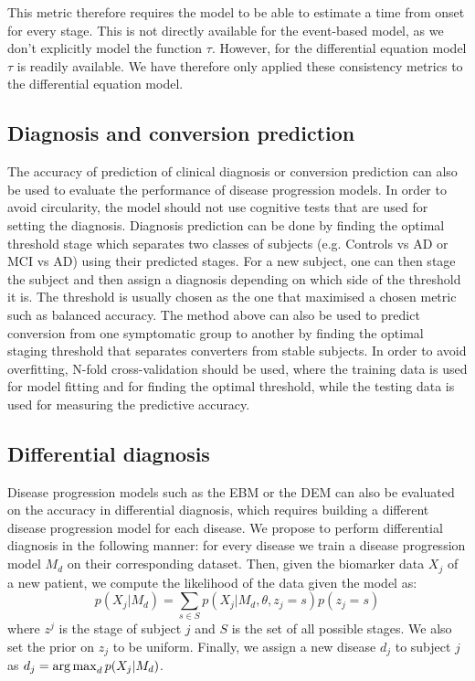 This metric therefore requires the model to be able to estimate a time from onset for every stage. This is not directly available for the event-based model, as we don't explicitly model the function $\tau$. However, for the differential equation model $\tau$ is readily available. We have therefore only applied these consistency metrics to the differential equation model.

\subsection{Diagnosis and conversion prediction}
\label{sec:diagBasedMetrics}

The accuracy of prediction of clinical diagnosis or conversion prediction can also be used to evaluate the performance of disease progression models. In order to avoid circularity, the model should not use cognitive tests that are used for setting the diagnosis. Diagnosis prediction can be done by finding the optimal threshold stage which separates two classes of subjects (e.g. Controls vs AD or MCI vs AD) using their predicted stages. For a new subject, one can then stage the subject and then assign a diagnosis depending on which side of the threshold it is. The threshold is usually chosen as the one that maximised a chosen metric such as balanced accuracy. The method above can also be used to predict conversion from one symptomatic group to another by finding the optimal staging threshold that separates converters from stable subjects. In order to avoid overfitting, N-fold cross-validation should be used, where the training data is used for model fitting and for finding the optimal threshold, while the testing data is used for measuring the predictive accuracy. 

\subsection{Differential diagnosis}
\label{sec:diff_diagnosis_ebm}
% 
Disease progression models such as the EBM or the DEM can also be evaluated on the accuracy in differential diagnosis, which requires building a different disease progression model for each disease. We propose to perform differential diagnosis in the following manner: for every disease we train a disease progression model $M_d$ on their corresponding dataset. Then, given the biomarker data $X_j$ of a new patient, we compute the likelihood of the data given the model as:
\begin{equation}
 p(X_j|M_d) = \sum_{s \in S} p(X_j|M_d, \theta, z_j = s)p(z_j = s)
\end{equation}
where $z^j$ is the stage of subject $j$ and $S$ is the set of all possible stages. We also set the prior on $z_j$ to be uniform. Finally, we assign a new disease $d_j$ to subject $j$ as $d_j = \operatorname*{arg\,max}_d p(X_j|M_d)$.

